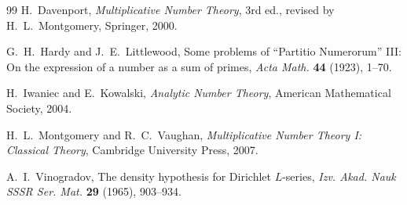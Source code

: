 \documentclass[11pt]{article}
\theoremstyle{definition}
\theoremstyle{remark}
\begin{document}
\begin{thebibliography}{99}
H.~Davenport,
\newblock \emph{Multiplicative Number Theory},
\newblock 3rd ed., revised by H.~L.~Montgomery, Springer, 2000.

G.~H.~Hardy and J.~E.~Littlewood,
\newblock Some problems of ``Partitio Numerorum'' III: On the expression of a
number as a sum of primes,
\newblock \emph{Acta Math.} \textbf{44} (1923), 1--70.

H.~Iwaniec and E.~Kowalski,
\newblock \emph{Analytic Number Theory},
\newblock American Mathematical Society, 2004.

H.~L.~Montgomery and R.~C.~Vaughan,
\newblock \emph{Multiplicative Number Theory I: Classical Theory},
\newblock Cambridge University Press, 2007.

A.~I.~Vinogradov,
\newblock The density hypothesis for Dirichlet $L$-series,
\newblock \emph{Izv. Akad. Nauk SSSR Ser. Mat.} \textbf{29} (1965), 903--934.

\end{thebibliography}
\end{document}
